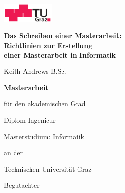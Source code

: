 
\cleardoublepage

\begin{otherlanguage}{austrian}

\vspace*{-3cm}

\begin{center}
\includegraphics[height=1cm]{diagrams/tugraz-logo.pdf}

\vspace{2cm}

\begin{spacing}{1.1}
\huge\sffamily\bfseries
Das Schreiben einer Masterarbeit:\\
Richtlinien zur Erstellung\\
einer Masterarbeit in Informatik
\end{spacing}

\vspace{2cm}

{\Large\sffamily Keith Andrews B.Sc.}

\vspace{2cm}

{\Large\sffamily\bfseries Masterarbeit}

\vspace{5mm}

{\small\sffamily für den akademischen Grad}

\vspace{5mm}

{\normalsize\sffamily Diplom-Ingenieur}

\vspace{5mm}

{\normalsize\sffamily
Masterstudium: Informatik
}


\vspace{1cm}

{\small\sffamily an der}

\vspace{5mm}

{\large\sffamily Technischen Universität Graz}



\vspace{1cm}

{\small\sffamily Begutachter}

\vspace{5mm}


\end{center}
\end{otherlanguage}
